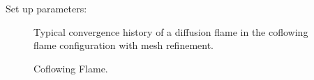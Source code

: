 Set up parameters: 
\begin{figure}[t!]
	\centering
	\caption{Typical convergence history of a diffusion flame in the coflowing flame configuration with mesh refinement.}
	\label{fig:CoFlow_ConvergenceStory}
\end{figure}
\begin{figure}[t]
	\centering
	\pgfplotsset{width=0.65\textwidth, compat=1.3}
	\caption{Coflowing Flame.} \label{fig:CoFlowFlameFig}
\end{figure}


\FloatBarrier